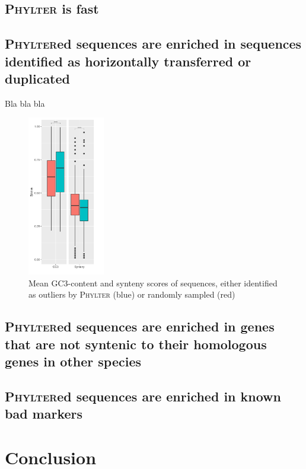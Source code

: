 \documentclass{article}
\begin{document}
\subsection{\textsc{Phylter} is fast}
\subsection{\textsc{Phylter}ed sequences are enriched in sequences identified as horizontally transferred or duplicated}
 Bla bla bla 

\begin{figure}
    \includegraphics[width=0.3\textwidth]{fig/mammals-boxplot_EDITED.png}
  \caption{Mean GC3-content and synteny scores of sequences, either identified as outliers by \textsc{Phylter} (blue) or randomly sampled (red)}
\end{figure} 


\subsection{\textsc{Phylter}ed sequences are enriched in genes that are not syntenic to their homologous genes in other species}

\subsection{\textsc{Phylter}ed sequences are enriched in known bad markers}


\section{Conclusion}


\printbibliography

\newpage

\end{document}
